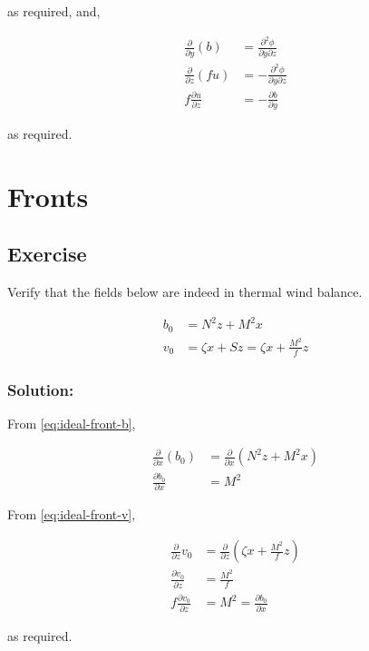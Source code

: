 \documentclass[12 pt]{article}
\numberwithin{equation}{section} %
\begin{document}
as required, and,

\begin{align*}
  \frac{\partial}{\partial y}(b) &= \frac{\partial^2 \phi}{\partial y \partial z} \\
  \frac{\partial}{\partial z}(fu) &= -\frac{\partial^2 \phi}{\partial y \partial z} \\
  f \frac{\partial u}{\partial z} &= -\frac{\partial b}{\partial y}
\end{align*}

as required.


\section{Fronts}

\subsection{Exercise}

Verify that the fields below are indeed in thermal wind balance.

\begin{align} 
  b_0 &= N^2z + M^2 x  \label{eq:ideal-front-b} \\
  v_0 &= \zeta x +Sz = \zeta x + \frac{M^2}{f} z \label{eq:ideal-front-v} 
\end{align}

\subsubsection*{Solution:}
From \ref{eq:ideal-front-b},

\begin{align*}
  \frac{\partial}{\partial x}(b_0) &= \frac{\partial}{\partial x}(N^2 z + M^2 x) \\
  \frac{\partial b_0}{\partial x} &= M^2
\end{align*}

From \ref{eq:ideal-front-v},

\begin{align*}
  \frac{\partial}{\partial z} v_0 &= \frac{\partial}{\partial z}\left( \zeta x + \frac{M^2}{f}z \right) \\
  \frac{\partial v_0}{\partial z} &= \frac{M^2}{f} \\
  f\frac{\partial v_0}{\partial z} &= M^2 = \frac{\partial b_0}{\partial x}
\end{align*}

as required. \\
\end{document}
